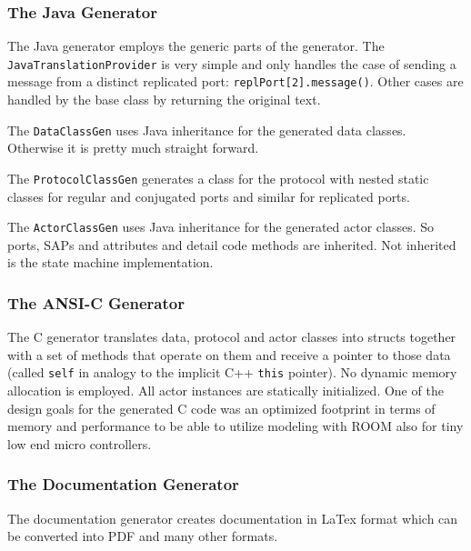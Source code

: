 \subsubsection{The Java Generator}

The Java generator employs the generic parts of the generator. The \texttt{JavaTranslationProvider} is 
very simple and only handles the case of sending a message from a distinct replicated port: 
\texttt{replPort[2].message()}. Other cases are handled by the base class by returning the original text.

The \texttt{DataClassGen} uses Java inheritance for the generated data classes. Otherwise it is pretty 
much straight forward.

The \texttt{ProtocolClassGen} generates a class for the protocol with nested static classes for regular 
and conjugated ports and similar for replicated ports.

The \texttt{ActorClassGen} uses Java inheritance for the generated actor classes. So ports, SAPs and 
attributes and detail code methods are inherited. Not inherited is the state machine implementation.

\subsubsection{The ANSI-C Generator}

The C generator translates data, protocol and actor classes into structs together with a set of methods 
that operate on them and receive a pointer to those data (called \texttt{self} in analogy to the implicit 
C++ \texttt{this} pointer).
No dynamic memory allocation is employed. All actor instances are statically initialized.
One of the design goals for the generated C code was an optimized footprint in terms of memory and 
performance to be able to utilize modeling with ROOM also for tiny low end micro controllers.

\subsubsection{The Documentation Generator}

The documentation generator creates documentation in LaTex format which can be converted into PDF and many 
other formats.
